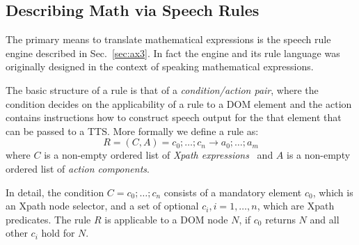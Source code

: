 \documentclass{sig-alternate}
\begin{document}
\subsection{Describing Math via Speech Rules}

\newcommand{\srule}[2]{\ensuremath{#1 \rightarrow #2}}
\newcommand{\slist}[1]{\ensuremath{#1}}
\newcommand{\ttrule}[2]{
  
  \noindent\centerline{\texttt{#1}$\rightarrow$\texttt{#2}}}
\newcommand{\tttrule}[2]{

  \noindent
  \texttt{#1}\newline\hspace*{\fill}$\longrightarrow$\texttt{#2}

}
\def\cR{{\cal R}} \def\cN{{\cal N}} \def\assign#1#2{{#1}\leftarrow{#2}} 


The primary means to translate mathematical expressions is the speech rule
engine described in Sec.~\ref{sec:ax3}. In fact the engine and its rule language
was originally designed in the context of speaking mathematical expressions.

The basic structure of a rule is that of a \emph{condition/action pair}, where
the condition decides on the applicability of a rule to a DOM element and the
action contains instructions how to construct speech output for the that element
that can be passed to a TTS. More formally we define a rule as:
\[R= ({C},{A}) = \srule{\slist{c_0;\ldots;c_n}}{\slist{a_0;\ldots;a_m}} \] where
$C$ is a non-empty ordered list of \emph{Xpath expressions}~\cite{clark1999xpl} and
$A$ is a non-empty ordered list of \emph{action components}.

In detail, the condition $C=\slist{c_0;\ldots;c_n}$ consists of a mandatory
element $c_0$, which is an Xpath node selector, and a set of optional $c_i,
i=1,\ldots,n$, which are Xpath predicates. The rule $R$ is applicable to a DOM
node $N$, if $c_0$ returns $N$ and all other $c_i$ hold for $N$.
\end{document}

